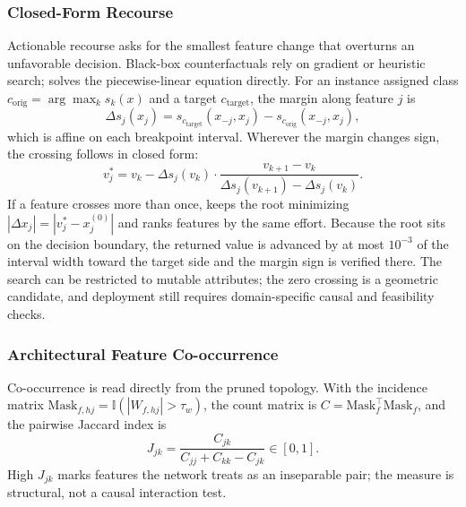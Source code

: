 \subsubsection{Closed-Form Recourse}
Actionable recourse asks for the smallest feature change that overturns an
unfavorable decision. Black-box counterfactuals rely on gradient or heuristic
search; \modelname{} solves the piecewise-linear equation directly. For an
instance assigned class $c_{\text{orig}} = \arg\max_k s_k(x)$ and a target
$c_{\text{target}}$, the margin along feature $j$ is
\begin{equation}
\Delta s_j(x_j) = s_{c_{\text{target}}}(x_{-j}, x_j) - s_{c_{\text{orig}}}(x_{-j}, x_j),
\end{equation}
which is affine on each breakpoint interval. Wherever the margin changes sign, the
crossing follows in closed form:
\begin{equation}
\label{eq:exact_recourse}
v_j^* = v_k - \Delta s_j(v_k) \cdot \frac{v_{k+1} - v_k}{\Delta s_j(v_{k+1}) - \Delta s_j(v_k)}.
\end{equation}
If a feature crosses more than once, \modelname{} keeps the root minimizing
$|\Delta x_j| = |v_j^* - x_j^{(0)}|$ and ranks features by the same effort. Because
the root sits on the decision boundary, the returned value is advanced by at most
$10^{-3}$ of the interval width toward the target side and the margin sign is
verified there. The search can be restricted to mutable attributes; the zero
crossing is a geometric candidate, and deployment still requires domain-specific
causal and feasibility checks.

\subsubsection{Architectural Feature Co-occurrence}
Co-occurrence is read directly from the pruned topology. With the incidence
matrix $\text{Mask}_{f,hj} = \mathbb{I}(|W_{f,hj}| > \tau_w)$, the count matrix is
$C = \text{Mask}_f^\top \text{Mask}_f$, and the pairwise Jaccard index is
\begin{equation}
\label{eq:jaccard}
J_{jk} = \frac{C_{jk}}{C_{jj} + C_{kk} - C_{jk}} \in [0, 1].
\end{equation}
High $J_{jk}$ marks features the network treats as an inseparable pair; the
measure is structural, not a causal interaction test.
